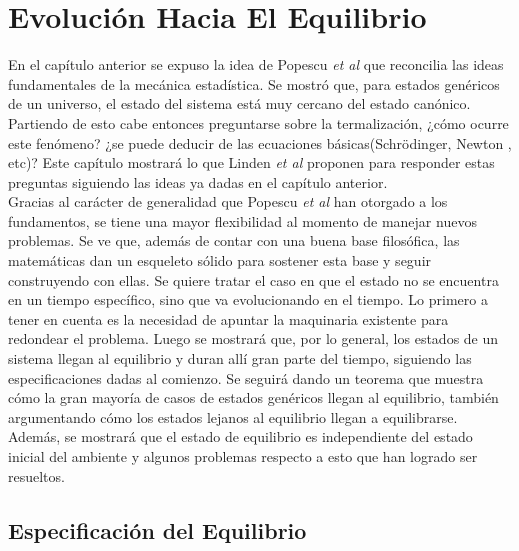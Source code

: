 \chapter{Evolución Hacia El Equilibrio}

En el capítulo anterior se expuso la idea de Popescu \textit{et al} \cite{Popescu2006} que reconcilia las ideas fundamentales de la mecánica estadística. Se mostró que, para estados genéricos de un universo, el estado del sistema está muy cercano del estado canónico. Partiendo de esto cabe entonces preguntarse sobre la termalización, ¿cómo ocurre este fenómeno? ¿se puede deducir de las ecuaciones básicas(Schrödinger, Newton , etc)? Este capítulo mostrará lo que Linden \textit{et al} \cite{LindenPaper} proponen para responder estas preguntas siguiendo las ideas ya dadas en el capítulo anterior. 
\\
Gracias al carácter de generalidad que Popescu \textit{et al} han otorgado a los fundamentos, se tiene una mayor flexibilidad al momento de manejar nuevos problemas. Se ve que, además de contar con una buena base filosófica, las matemáticas dan un esqueleto sólido para sostener esta base y seguir construyendo con ellas. Se quiere tratar el caso en que el estado no se encuentra en un tiempo específico, sino que va evolucionando en el tiempo. Lo primero a tener en cuenta es la necesidad de apuntar la maquinaria existente para redondear el problema. Luego se mostrará que, por lo general, los estados de un sistema llegan al equilibrio y duran allí gran parte del tiempo, siguiendo las especificaciones dadas al comienzo. Se seguirá dando un teorema que muestra cómo la gran mayoría de casos de estados genéricos llegan al equilibrio, también argumentando cómo los estados lejanos al equilibrio llegan a equilibrarse. Además, se mostrará que el estado de equilibrio es independiente del estado inicial del ambiente y algunos problemas respecto a esto que han logrado ser resueltos.  

\section{Especificación del Equilibrio}

